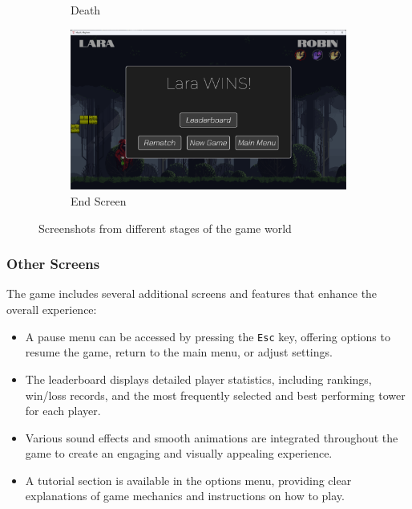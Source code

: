 \documentclass[10.5pt]{article}
\begin{document}
\begin{figure}[h!]
\begin{subfigure}[b]{0.35\textwidth}
        \caption{Death}
        \label{fig:image3}
    \end{subfigure}
    \hfill
    \begin{subfigure}[b]{0.35\textwidth}
        \includegraphics[width=\textwidth]{game4.png}
        \caption{End Screen}
        \label{fig:image4}
    \end{subfigure}
    \caption{Screenshots from different stages of the game world}
    \label{fig:2x2grid}
\end{figure}

\newpage

\subsubsection{Other Screens}
The game includes several additional screens and features that enhance the overall experience:
\begin{itemize}
    \item A pause menu can be accessed by pressing the \texttt{Esc} key, offering options to resume the game, return to the main menu, or adjust settings.
    \item The leaderboard displays detailed player statistics, including rankings, win/loss records, and the most frequently selected and best performing tower for each player.
    \item Various sound effects and smooth animations are integrated throughout the game to create an engaging and visually appealing experience.
    \item A tutorial section is available in the options menu, providing clear explanations of game mechanics and instructions on how to play.
\end{itemize}

\vspace{0.2cm}
\end{document}
